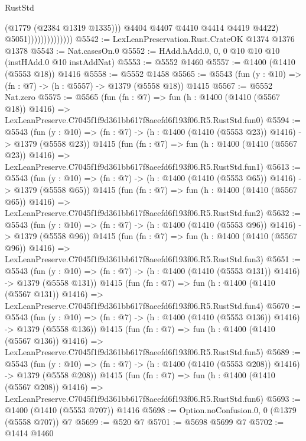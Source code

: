 \begin{lexlean}{RustStd}
\begin{coremodule}
                                    (@1779 (@2384 @1319 @1335)))
                                  @4404
                                  @4407
                                  @4410
                                  @4414
                                  @4419
                                  @4422)
                                @5051))))))))))))))
@5542 := LexLeanPreservation.Rust.CrateOK @1374 @1376 @1378
@5543 := Nat.casesOn.{0}
@5552 := HAdd.hAdd.{0, 0, 0} @10 @10 @10 (instHAdd.{0} @10 instAddNat)
@5553 := @5552 @1460
@5557 := @1400 (@1410 (@5553 @18)) @1416
@5558 := @5552 @1458
@5565 := @5543 (fun (y : @10) => (fn : @7) -> (h : @5557) -> @1379 (@5558 @18)) @1415
@5567 := @5552 Nat.zero
@5575 := @5565
    (fun (fn : @7) =>
    fun (h : @1400 (@1410 (@5567 @18)) @1416) =>
    LexLeanPreserve.C7045f1f9d361bb617f8aeefd6f193f06.R5.RustStd.fun0)
@5594 := @5543
    (fun (y : @10) => (fn : @7) -> (h : @1400 (@1410 (@5553 @23)) @1416) -> @1379 (@5558 @23))
    @1415
    (fun (fn : @7) =>
    fun (h : @1400 (@1410 (@5567 @23)) @1416) =>
    LexLeanPreserve.C7045f1f9d361bb617f8aeefd6f193f06.R5.RustStd.fun1)
@5613 := @5543
    (fun (y : @10) => (fn : @7) -> (h : @1400 (@1410 (@5553 @65)) @1416) -> @1379 (@5558 @65))
    @1415
    (fun (fn : @7) =>
    fun (h : @1400 (@1410 (@5567 @65)) @1416) =>
    LexLeanPreserve.C7045f1f9d361bb617f8aeefd6f193f06.R5.RustStd.fun2)
@5632 := @5543
    (fun (y : @10) => (fn : @7) -> (h : @1400 (@1410 (@5553 @96)) @1416) -> @1379 (@5558 @96))
    @1415
    (fun (fn : @7) =>
    fun (h : @1400 (@1410 (@5567 @96)) @1416) =>
    LexLeanPreserve.C7045f1f9d361bb617f8aeefd6f193f06.R5.RustStd.fun3)
@5651 := @5543
    (fun (y : @10) => (fn : @7) -> (h : @1400 (@1410 (@5553 @131)) @1416) -> @1379 (@5558 @131))
    @1415
    (fun (fn : @7) =>
    fun (h : @1400 (@1410 (@5567 @131)) @1416) =>
    LexLeanPreserve.C7045f1f9d361bb617f8aeefd6f193f06.R5.RustStd.fun4)
@5670 := @5543
    (fun (y : @10) => (fn : @7) -> (h : @1400 (@1410 (@5553 @136)) @1416) -> @1379 (@5558 @136))
    @1415
    (fun (fn : @7) =>
    fun (h : @1400 (@1410 (@5567 @136)) @1416) =>
    LexLeanPreserve.C7045f1f9d361bb617f8aeefd6f193f06.R5.RustStd.fun5)
@5689 := @5543
    (fun (y : @10) => (fn : @7) -> (h : @1400 (@1410 (@5553 @208)) @1416) -> @1379 (@5558 @208))
    @1415
    (fun (fn : @7) =>
    fun (h : @1400 (@1410 (@5567 @208)) @1416) =>
    LexLeanPreserve.C7045f1f9d361bb617f8aeefd6f193f06.R5.RustStd.fun6)
@5693 := @1400 (@1410 (@5553 @707)) @1416
@5698 := Option.noConfusion.{0, 0} (@1379 (@5558 @707)) @7
@5699 := @520 @7
@5701 := @5698 @5699 @7
@5702 := @1414 @1460

\end{coremodule}
\end{lexlean}
